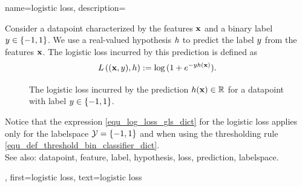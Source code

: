 {name={logistic loss}, 
	description={Consider 
		a \gls{datapoint} characterized by the \glspl{feature} ${\bf x}$ and a binary \gls{label} $y \in \{-1,1\}$. 
		We use a real-valued \gls{hypothesis} $h$ to predict the \gls{label} $y$ 
		from the \glspl{feature} ${\bf x}$. The logistic \gls{loss} incurred by this \gls{prediction} is 
		defined as 
	\begin{equation} 
		\label{equ_log_loss_gls_dict}
		L\left(({\bf x},y),h \right) :=  \log\, ( 1 + e^{- y h({\bf x})}).
	\end{equation}
	\begin{figure}[H]
	\begin{center}
		\caption{The logistic \gls{loss} incurred by the \gls{prediction} $h({\bf x}) \in \mathbb{R}$ 
			for a \gls{datapoint} with \gls{label} $y \in \{-1,1\}$.}
		\label{fig_logloss_dict}
	\end{center}
	\end{figure}
	Notice that the expression \eqref{equ_log_loss_gls_dict} 
	for the logistic \gls{loss} applies only for the \gls{labelspace} $\mathcal{Y} = \{ -1,1\}$ and when using 
	the thresholding rule \eqref{equ_def_threshold_bin_classifier_dict}. 
		\\
		See also: \gls{datapoint}, \gls{feature}, \gls{label}, \gls{hypothesis}, \gls{loss}, \gls{prediction}, \gls{labelspace}.},
	first={logistic loss},
	text={logistic loss}
}
	
